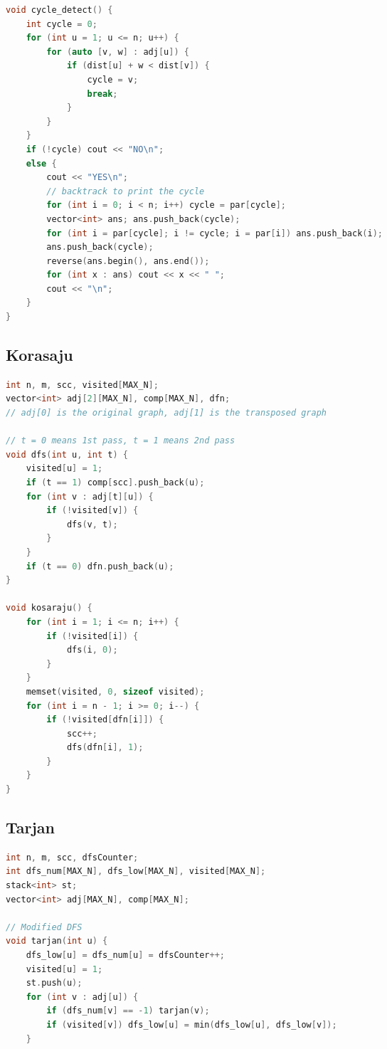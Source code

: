 \documentclass{article}
\begin{document}
\begin{multicols}{2}
\begin{lstlisting}[linewidth=\columnwidth,breaklines=true,language=C++]
void cycle_detect() {
    int cycle = 0;
    for (int u = 1; u <= n; u++) {
        for (auto [v, w] : adj[u]) {
            if (dist[u] + w < dist[v]) {
                cycle = v; 
                break;
            }
        }
    }
    if (!cycle) cout << "NO\n";
    else {
        cout << "YES\n";
        // backtrack to print the cycle
        for (int i = 0; i < n; i++) cycle = par[cycle];
        vector<int> ans; ans.push_back(cycle);
        for (int i = par[cycle]; i != cycle; i = par[i]) ans.push_back(i); 
        ans.push_back(cycle);
        reverse(ans.begin(), ans.end());
        for (int x : ans) cout << x << " ";
        cout << "\n";
    }
}
\end{lstlisting}
\subsection{Korasaju}
\lstset {    language=C++,
    basicstyle=\small\ttfamily,
    numbers=left,
    breaklines=true,
    tabsize=4}
\begin{lstlisting}[linewidth=\columnwidth,breaklines=true,language=C++]
int n, m, scc, visited[MAX_N];
vector<int> adj[2][MAX_N], comp[MAX_N], dfn;
// adj[0] is the original graph, adj[1] is the transposed graph

// t = 0 means 1st pass, t = 1 means 2nd pass
void dfs(int u, int t) {
    visited[u] = 1;
    if (t == 1) comp[scc].push_back(u);
    for (int v : adj[t][u]) {
        if (!visited[v]) {
            dfs(v, t);
        }
    }
    if (t == 0) dfn.push_back(u);
}

void kosaraju() {
    for (int i = 1; i <= n; i++) {
        if (!visited[i]) {
            dfs(i, 0);
        }
    }
    memset(visited, 0, sizeof visited);
    for (int i = n - 1; i >= 0; i--) {
        if (!visited[dfn[i]]) {
            scc++;
            dfs(dfn[i], 1);
        }
    }
}
\end{lstlisting}
\subsection{Tarjan}
\lstset {    language=C++,
    basicstyle=\small\ttfamily,
    numbers=left,
    breaklines=true,
    tabsize=4}
\begin{lstlisting}[linewidth=\columnwidth,breaklines=true,language=C++]
int n, m, scc, dfsCounter;
int dfs_num[MAX_N], dfs_low[MAX_N], visited[MAX_N];
stack<int> st;
vector<int> adj[MAX_N], comp[MAX_N];

// Modified DFS
void tarjan(int u) { 
    dfs_low[u] = dfs_num[u] = dfsCounter++;
    visited[u] = 1;
    st.push(u);
    for (int v : adj[u]) {
        if (dfs_num[v] == -1) tarjan(v); 
        if (visited[v]) dfs_low[u] = min(dfs_low[u], dfs_low[v]); 
    }


\end{lstlisting}
\end{multicols}
\end{document}
